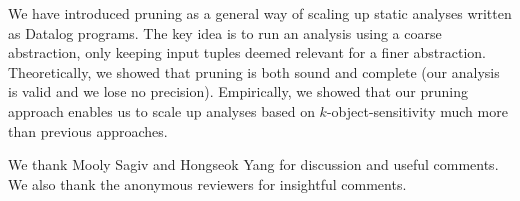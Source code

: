 
We have introduced pruning as a general way of scaling up static analyses
written as Datalog programs.  The key idea is to run an analysis using a coarse
abstraction, only keeping input tuples deemed relevant for a finer abstraction.
Theoretically, we showed that pruning is both sound and complete (our analysis
is valid and we lose no precision).  Empirically, we showed that our pruning
approach enables us to scale up analyses based on $k$-object-sensitivity much
more than previous approaches.

\acks
We thank Mooly Sagiv and Hongseok Yang for discussion and useful comments.
We also thank the anonymous reviewers for insightful comments.
